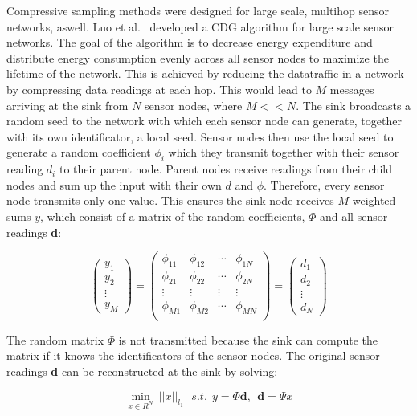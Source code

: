 Compressive sampling methods were designed for large scale, multihop sensor
networks, aswell. Luo et al.~\cite{luo2009compressive} developed a \ac{CDG}
algorithm for large scale sensor networks. The goal of the algorithm is to
decrease energy expenditure and distribute energy consumption evenly across all
sensor nodes to maximize the lifetime of the network. This is achieved by
reducing the datatraffic in a network by compressing data readings at each hop.
This would lead to $ M $ messages arriving at the sink from $ N $ sensor nodes,
where $ M << N $. The sink broadcasts a random seed to the network with which
each sensor node can generate, together with its own identificator, a local
seed. Sensor nodes then use the local seed to generate a random coefficient $
\phi_i $ which they transmit together with their sensor reading $ d_i $ to
their parent node. Parent nodes receive readings from their child nodes and sum
up the input with their own $ d $ and $ \phi $. Therefore, every sensor node
transmits only one value. This ensures the sink node receives $ M $ weighted
sums $ y $, which consist of a matrix of the random coefficients, $ \Phi $ and
all sensor readings \textbf{d}:

$$
\begin{pmatrix}
    y_1 \\
    y_2 \\
    \vdots \\
    y_M
\end{pmatrix}
=
\begin{pmatrix}
    \phi_{11} & \phi_{12} & \dotsb & \phi_{1N}\\
    \phi_{21} & \phi_{22} & \dotsb & \phi_{2N}\\
    \vdots & \vdots & \vdots & \vdots\\
    \phi_{M1} & \phi_{M2} & \dotsb & \phi_{MN}\\
\end{pmatrix}
=
\begin{pmatrix}
    d_1 \\
    d_2 \\
    \vdots \\
    d_N
\end{pmatrix}
$$

The random matrix $ \Phi $ is not transmitted because the sink can compute the
matrix if it knows the identificators of the sensor nodes. The original
sensor readings \textbf{d} can be reconstructed at the sink by solving:

$$
\displaystyle{\min_{x\in R^N} \ ||x||_{l_1}}  \ \ \   s.t.  \ \  y = \Phi \textbf{d} , \ \ 
\textbf{d}  = \Psi x
$$

